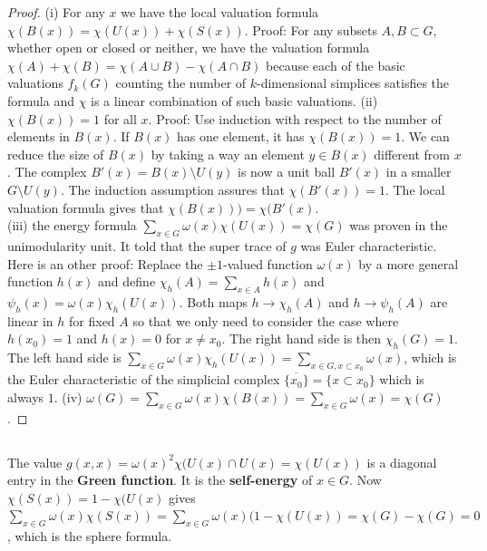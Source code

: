 \documentclass[12pt]{amsart}
\def\satz#1{ \vspace{1mm} \begin{center} \fcolorbox{black}{brightyellow}{ \parbox{15.2cm}{{\bf Theorem:} #1}} \vspace{1mm} \end{center} }
\let\paragraph\subsection
\begin{document}

\satz{ $\sum_{x \in G} \omega(x) \chi(S(x))=0$.  }

\begin{proof}
(i) For any $x$ we have the local valuation formula 
$\chi(B(x))=\chi(U(x))+\chi(S(x))$.
Proof: For any subsets $A,B \subset G$, whether open or closed or neither, we have
the valuation formula $\chi(A) + \chi(B) = \chi(A \cup B) - \chi(A \cap B)$ because
each of the basic valuations $f_k(G)$ counting the number of $k$-dimensional
simplices satisfies the formula and $\chi$ is a linear combination of such
basic valuations.
(ii) $\chi(B(x))=1$ for all $x$.
Proof: Use induction with respect to the number of elements in $B(x)$.
If $B(x)$ has one element, it has $\chi(B(x))=1$. We can reduce the size of $B(x)$ by
taking a way an element $y \in B(x)$ different from $x$. 
The complex $B'(x)=B(x) \setminus U(y)$ is
now a unit ball $B'(x)$ in a smaller $G \setminus U(y)$.  The induction assumption assures
that $\chi(B'(x))=1$. The local valuation formula gives that $\chi(B(x)))=\chi(B'(x)$. \\
(iii) the energy formula $\sum_{x \in G} \omega(x) \chi(U(x)) = \chi(G)$ was proven 
in the unimodularity unit. It told that the super trace of $g$ was Euler characteristic. 
Here is an other proof: Replace the $\pm 1$-valued function 
$\omega(x)$ by a more general function $h(x)$ and define
$\chi_h(A) = \sum_{x \in A} h(x)$ and $\psi_h(x) = \omega(x) \chi_h(U(x))$.
Both maps $h \to \chi_h(A)$ and $h \to \psi_h(A)$ are linear in $h$ for fixed $A$
so that we only need to consider the case where $h(x_0)=1$ and $h(x)=0$ for $x \neq x_0$.  
The right hand side is then $\chi_h(G) =1$. 
The left hand side is $\sum_{x \in G} \omega(x) \chi_h(U(x)) =
\sum_{x \in G, x \subset x_0} \omega(x)$, which is the Euler characteristic 
of the simplicial complex $\overline{ \{x_0\} } = \{ x \subset x_0 \}$ which is always $1$. 
(iv) $\omega(G) = \sum_{x \in G} \omega(x) \chi(B(x)) = 
   \sum_{x \in G} \omega(x) = \chi(G)$. 
\end{proof} 

\paragraph{}
The value $g(x,x)=\omega(x)^2 \chi(U(x) \cap U(x)= \chi(U(x))$ 
is a diagonal entry in the {\bf Green function}. It is the 
{\bf self-energy} of $x \in G$. Now $\chi(S(x)) = 1-\chi(U(x)$ gives
$\sum_{x \in G} \omega(x) \chi(S(x)) = \sum_{x \in G} \omega(x) (1-\chi(U(x)) = \chi(G) - \chi(G) = 0$, 
which is the sphere formula.  
\end{document}
